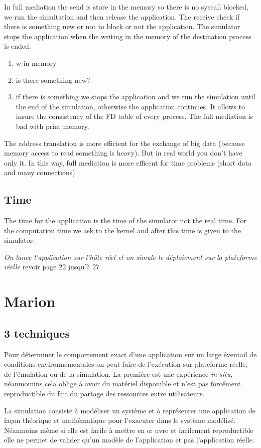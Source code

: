 \documentclass{article}
\begin{document}
In full mediation the send is store in the memory so there is no
syscall blocked, we run the simultation and then release the
application. The receive check if there is something new or not to
block or not the application. The simulator stops the application when
the writing in the memory of the destination process is ended.
\begin{enumerate}
\item w in memory
\item is there something new?
\item if there is something we stops the application and we run the
  simulation until the end of the simulation, otherwise the
  application continues.  It allows to insure the consistency of the
  FD table of every process. The full mediation is bad with print
  memory.
\end{enumerate}

The address translation is more efficient for the exchange of big data
(because memory access to read something is heavy). But in real world
you don't have only it. In this way, full mediation is more efficent
for time problems (short data and many connections)

\subsection{Time}
The time for the application is the time of the simulator not the real
time. For the computation time we ask to the kernel and after this
time is given to the simulator.

\textit{On lance l'application sur l'hôte réel et on simule le
  déploiement sur la plateforme réelle} {\color{red} revoir page 22
  jusqu'à 27}

\section{Marion}
\subsection{3 techniques}
Pour déterminer le comportement exact d'une application sur un large
éventail de conditions environnementales on peut faire de l'exécution
sur plateforme réelle, de l'émulation ou de la simulation. La première
est une expérience \textit{in situ}, néanmomins cela oblige à avoir du
matériel disponible et n'est pas forcément reproductible du fait du
partage des ressources entre utilisateurs.

La simulation consiste à modéliser un système et à représenter une
application de façon théorique et mathématique pour l'exacuter dans le
système modélisé. Néanmoins même si elle est facile à mettre en \oe
uvre et facilement reproductible elle ne permet de valider qu'un
modèle de l'application et pas l'application réelle.
\end{document}
